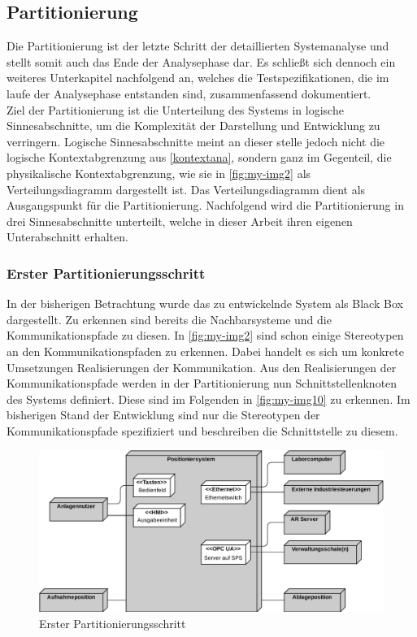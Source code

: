 \documentclass[../Bachelorarbeit.tex]{subfiles}
\begin{document}
\subsection{Partitionierung}
Die Partitionierung ist der letzte Schritt der detaillierten Systemanalyse und stellt somit auch das Ende der Analysephase dar. Es schließt sich dennoch ein weiteres Unterkapitel nachfolgend an, welches die Testspezifikationen, die im laufe der Analysephase entstanden sind, zusammenfassend dokumentiert. \\
Ziel der Partitionierung ist die Unterteilung des Systems in logische Sinnesabschnitte, um die Komplexität der Darstellung und Entwicklung zu verringern. Logische Sinnesabschnitte meint an dieser stelle jedoch nicht die logische Kontextabgrenzung aus \autoref{kontextana}, sondern ganz im Gegenteil, die physikalische Kontextabgrenzung, wie sie in \autoref{fig:my-img2} als Verteilungsdiagramm dargestellt ist. Das Verteilungsdiagramm dient als Ausgangspunkt für die Partitionierung. Nachfolgend wird die Partitionierung in drei Sinnesabschnitte unterteilt, welche in dieser Arbeit ihren eigenen Unterabschnitt erhalten. \\ %

\subsubsection{Erster Partitionierungsschritt}
In der bisherigen Betrachtung wurde das zu entwickelnde System als Black Box dargestellt. Zu erkennen sind bereits die Nachbarsysteme und die Kommunikationspfade zu diesen. In \autoref{fig:my-img2} sind schon einige Stereotypen an den Kommunikationspfaden zu erkennen. Dabei handelt es sich um konkrete Umsetzungen \bzw Realisierungen der Kommunikation. Aus den Realisierungen der Kommunikationspfade werden in der Partitionierung nun Schnittstellenknoten des Systems definiert. Diese sind im Folgenden in \autoref{fig:my-img10} zu erkennen. Im bisherigen Stand der Entwicklung sind nur die Stereotypen der Kommunikationspfade spezifiziert und beschreiben die Schnittstelle zu diesem. 

\begin{figure}[H]
    \centering
    \includegraphics[width=\textwidth]{Images/erster_schritt.pdf}
    \caption[Erster Partitionierungsschritt]{Erster Partitionierungsschritt}
    \label{fig:my-img10}
\end{figure}
\end{document}
